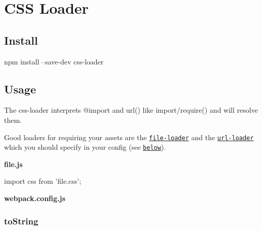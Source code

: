 \href{https://npmjs.com/package/css-loader}{\tt } \href{https://nodejs.org}{\tt } \href{https://david-dm.org/webpack-contrib/css-loader}{\tt } \href{https://travis-ci.org/webpack-contrib/css-loader}{\tt } \href{https://codecov.io/gh/webpack-contrib/css-loader}{\tt } \href{https://gitter.im/webpack/webpack}{\tt }

  \href{https://github.com/webpack/webpack}{\tt } \section*{C\+SS Loader}

 

\subsection*{Install}


\begin{DoxyCode}
npm install --save-dev css-loader
\end{DoxyCode}


\subsection*{Usage}

The {\ttfamily css-\/loader} interprets {\ttfamily @import} and {\ttfamily url()} like {\ttfamily import/require()} and will resolve them.

Good loaders for requiring your assets are the \href{https://github.com/webpack/file-loader}{\tt file-\/loader} and the \href{https://github.com/webpack/url-loader}{\tt url-\/loader} which you should specify in your config (see \href{https://github.com/michael-ciniawsky/css-loader#assets}{\tt below}).

{\bfseries file.\+js} 
\begin{DoxyCode}
import css from 'file.css';
\end{DoxyCode}


{\bfseries webpack.\+config.\+js} 


\subsubsection*{{\ttfamily to\+String}}

